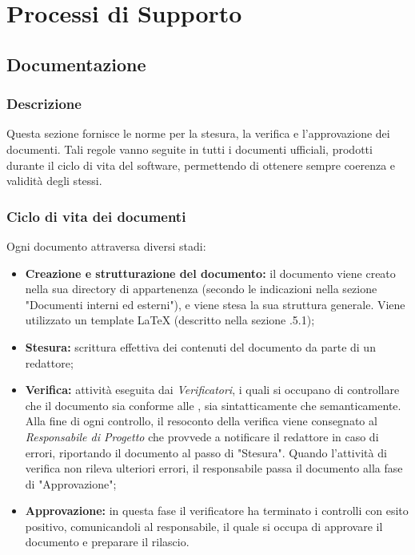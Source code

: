 \section{Processi di Supporto}
  \subsection{Documentazione}
    \subsubsection{Descrizione}
      Questa sezione fornisce le norme per la stesura, la verifica e l'approvazione dei documenti. Tali regole vanno seguite in tutti i documenti ufficiali, prodotti durante il ciclo di vita del software, permettendo di ottenere sempre coerenza e validità degli stessi.

    \subsubsection{Ciclo di vita dei documenti}
      Ogni documento attraversa diversi stadi:
      \begin{itemize}
        \item \textbf{Creazione e strutturazione del documento:} il documento viene creato nella sua directory di appartenenza (secondo le indicazioni nella sezione "Documenti interni ed esterni"), e viene stesa la sua struttura generale. Viene utilizzato un template \LaTeX{} (descritto nella sezione .5.1);
        \item \textbf{Stesura:} scrittura effettiva dei contenuti del documento da parte di un redattore;
        \item \textbf{Verifica:} attività eseguita dai \textit{Verificatori}, i quali si occupano di controllare che il documento sia conforme alle \textit{\NdP{}}, sia sintatticamente che semanticamente. Alla fine di ogni controllo, il resoconto della verifica viene consegnato al \textit{Responsabile di Progetto} che provvede a notificare il redattore in caso di errori, riportando il documento al passo di "Stesura". Quando l'attività di verifica non rileva ulteriori errori, il responsabile passa il documento alla fase di "Approvazione";
        \item \textbf{Approvazione:} in questa fase il verificatore ha terminato i controlli con esito positivo, comunicandoli al responsabile, il quale si occupa di approvare il documento e preparare il rilascio.
      \end{itemize}

